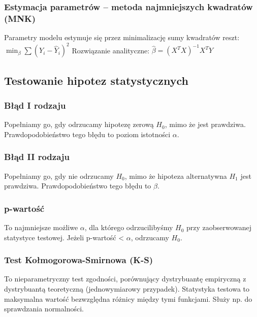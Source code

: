 \subsubsection*{Estymacja parametrów -- metoda najmniejszych kwadratów (MNK)}
Parametry modelu estymuje się przez minimalizację sumy kwadratów reszt:
$\min_\beta \sum (Y_i - \hat{Y}_i)^2$
Rozwiązanie analityczne:
$\hat{\beta} = (X^T X)^{-1} X^T Y$

\subsection{Testowanie hipotez statystycznych}
\subsubsection*{Błąd I rodzaju}
Popełniamy go, gdy odrzucamy hipotezę zerową $H_0$, mimo że jest prawdziwa. Prawdopodobieństwo tego błędu to poziom istotności $\alpha$.

\subsubsection*{Błąd II rodzaju}
Popełniamy go, gdy nie odrzucamy $H_0$, mimo że hipoteza alternatywna $H_1$ jest prawdziwa. Prawdopodobieństwo tego błędu to $\beta$.

\subsubsection*{p-wartość}
To najmniejsze możliwe $\alpha$, dla którego odrzucilibyśmy $H_0$ przy zaobserwowanej statystyce testowej. Jeżeli p-wartość < $\alpha$, odrzucamy $H_0$.

\subsubsection*{Test Kołmogorowa-Smirnowa (K-S)}
To nieparametryczny test zgodności, porównujący dystrybuantę empiryczną z dystrybuantą teoretyczną (jednowymiarowy przypadek). Statystyka testowa to maksymalna wartość bezwzględna różnicy między tymi funkcjami. Służy np. do sprawdzania normalności.
